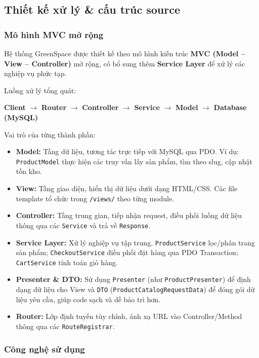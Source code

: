 \documentclass[11pt, a4paper]{article}
\begin{document}
\subsection{Thiết kế xử lý \& cấu trúc source}

\subsubsection{Mô hình MVC mở rộng}

Hệ thống GreenSpace được thiết kế theo mô hình kiến trúc \textbf{MVC (Model -- View -- Controller)} mở rộng, có bổ sung thêm \textbf{Service Layer} để xử lý các nghiệp vụ phức tạp.

Luồng xử lý tổng quát:
\begin{center}
\textbf{Client} $\rightarrow$ \textbf{Router} $\rightarrow$ \textbf{Controller} $\rightarrow$ \textbf{Service} $\rightarrow$ \textbf{Model} $\rightarrow$ \textbf{Database (MySQL)}
\end{center}

Vai trò của từng thành phần:
\begin{itemize}[leftmargin=*]
    \item \textbf{Model:} Tầng dữ liệu, tương tác trực tiếp với MySQL qua PDO. Ví dụ: \texttt{ProductModel} thực hiện các truy vấn lấy sản phẩm, tìm theo slug, cập nhật tồn kho.
    \item \textbf{View:} Tầng giao diện, hiển thị dữ liệu dưới dạng HTML/CSS. Các file template tổ chức trong \texttt{/views/} theo từng module.
    \item \textbf{Controller:} Tầng trung gian, tiếp nhận request, điều phối luồng dữ liệu thông qua các \texttt{Service} và trả về \texttt{Response}.
    \item \textbf{Service Layer:} Xử lý nghiệp vụ tập trung. \texttt{ProductService} lọc/phân trang sản phẩm; \texttt{CheckoutService} điều phối đặt hàng qua PDO Transaction; \texttt{CartService} tính toán giỏ hàng.
    \item \textbf{Presenter \& DTO:} Sử dụng \texttt{Presenter} (như \texttt{ProductPresenter}) để định dạng dữ liệu cho View và \texttt{DTO} (\texttt{ProductCatalogRequestData}) để đóng gói dữ liệu yêu cầu, giúp code sạch và dễ bảo trì hơn.
    \item \textbf{Router:} Lớp định tuyến tùy chỉnh, ánh xạ URL vào Controller/Method thông qua các \texttt{RouteRegistrar}.
\end{itemize}

\subsubsection{Công nghệ sử dụng}
\end{document}
